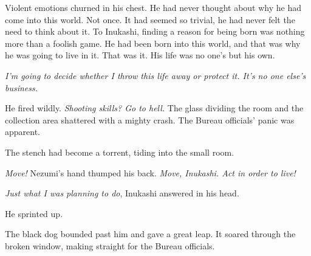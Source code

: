Violent emotions churned in his chest. He had never thought about why he
had come into this world. Not once. It had seemed so trivial, he had
never felt the need to think about it. To Inukashi, finding a reason for
being born was nothing more than a foolish game. He had been born into
this world, and that was why he was going to live in it. That was it.
His life was no one's but his own.

\emph{I'm going to decide whether I throw this life away or protect it. It's
no one else's business.}

He fired wildly. \emph{Shooting skills? Go to hell.} The glass dividing the
room and the collection area shattered with a mighty crash. The Bureau
officials' panic was apparent.

The stench had become a torrent, tiding into the small room.

\emph{Move!} Nezumi's hand thumped his back. \emph{Move, Inukashi. Act in order to
live!}

\emph{Just what I was planning to do}, Inukashi answered in his head.

He sprinted up.

The black dog bounded past him and gave a great leap. It soared through
the broken window, making straight for the Bureau officials.
